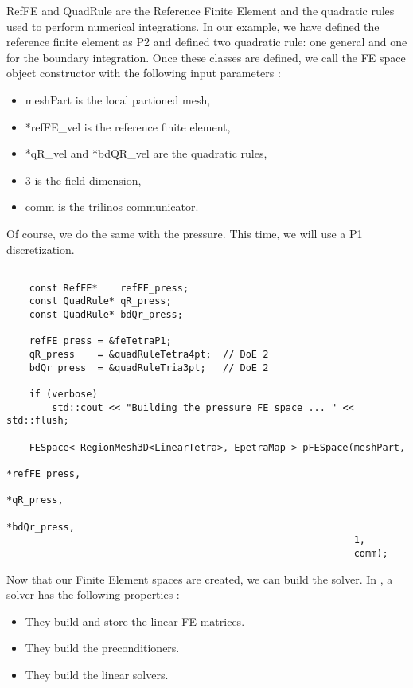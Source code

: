 RefFE and QuadRule are the Reference Finite Element and the quadratic
rules used to perform numerical integrations. In our example, we have defined the
reference finite element as P2 and defined two quadratic rule: one general and one
for the boundary integration. Once these classes are defined, we call the FE space
object constructor with the following input parameters :
\begin{itemize}
\item meshPart is the local partioned mesh,
\item *refFE\_vel is the reference finite element,
\item *qR\_vel and *bdQR\_vel are the quadratic rules,
\item 3 is the field dimension,
\item comm is the trilinos communicator.
\end{itemize}
Of course, we do the same with the pressure. This time, we will use a P1 discretization.
\begin{verbatim}

    const RefFE*    refFE_press;
    const QuadRule* qR_press;
    const QuadRule* bdQr_press;

    refFE_press = &feTetraP1;
    qR_press    = &quadRuleTetra4pt;  // DoE 2
    bdQr_press  = &quadRuleTria3pt;   // DoE 2

    if (verbose)
        std::cout << "Building the pressure FE space ... " << std::flush;

    FESpace< RegionMesh3D<LinearTetra>, EpetraMap > pFESpace(meshPart,
                                                             *refFE_press,
                                                             *qR_press,
                                                             *bdQr_press,
                                                             1,
                                                             comm);

\end{verbatim}

Now that our Finite Element spaces are created, we can build the solver. In \lifev,
a solver has the following properties :
\begin{itemize}
\item They build and store the linear FE matrices.
\item They build the preconditioners.
\item They build the linear solvers.
\end{itemize}

